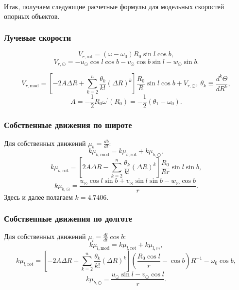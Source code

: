 \documentclass{matmex-diploma-custom}
\begin{document}
\par Итак, получаем следующие расчетные формулы для модельных скоростей опорных объектов.

\subsubsection{Лучевые скорости} \label{def_mod_vr}
\begin{equation}
        V_{r, \mathrm{rot}} = (\omega - \omega_0)R_0 \sin{l} \cos{b},
\end{equation}
\begin{equation}
        V_{r, \odot} = -u_{\odot} \cos{l} \cos{b} - v_{\odot} \cos{b} \sin{l} - w_{\odot} \sin{b}.
\end{equation}

\begin{equation}
        V_{r, \mathrm{mod}} = \left[ -2A\Delta R + \sum^n_{k = 2} \frac{\theta_k}{k!} \left( \Delta R \right)^k \right] \frac{R_0}{R} \sin{l} \cos{b} + V_{r, \odot}, ~\theta_k \equiv \frac{d^k\Theta}{dR^k},
\end{equation}
\begin{equation}
        A = - \frac{1}{2} R_0 \omega^{'}(R_0) = - \frac{1}{2} (\theta_1 - \omega_0).
\end{equation}
\subsubsection{Собственные движения по широте} \label{def_mod_b}
Для собственных движений $\mu_b = \frac{db}{dt}$:
\begin{equation}
        k\mu_{b, \mathrm{mod}} = k\mu_{b, \mathrm{rot}} + k\mu_{b, \odot},
\end{equation}
\begin{equation}
        k\mu_{b, \mathrm{rot}} = \left[ 2A\Delta R - \sum^n_{k = 2} \frac{\theta_k}{k!} \left( \Delta R \right)^k \right] \frac{R_0}{Rr} \sin{l} \sin{b},
\end{equation}
\begin{equation}
        k\mu_{b, \odot} = \frac{u_{\odot}\cos{l}\sin{b} + v_{\odot}\sin{l}\sin{b} - w_{\odot}\cos{b}}{r}.
\end{equation}
Здесь и далее полагаем $k=4.7406$.
\subsubsection{Собственные движения по долготе} \label{def_mod_l}
Для собственных движений $\mu_l = \frac{dl}{dt}\cos{b}$:
\begin{equation}
        k\mu_{l, \mathrm{mod}} = k\mu_{l, \mathrm{rot}} + k\mu_{l, \odot},
\end{equation}
\begin{equation}
        k\mu_{l, \mathrm{rot}} = \left[ -2A\Delta R + \sum^n_{k = 2} \frac{\theta_k}{k!} \left( \Delta R \right)^k \right] \left( \frac{R_0\cos{l}}{r} - \cos{b} \right) R^{-1} - \omega_0 \cos{b},
\end{equation}
\begin{equation}
        k\mu_{b, \odot} = \frac{u_{\odot}\sin{l}- v_{\odot}\cos{l}}{r}.
\end{equation}
\end{document}
